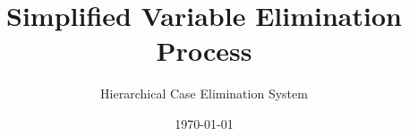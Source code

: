 \documentclass{article}
\begin{document}
\title{Simplified Variable Elimination Process}
\author{Hierarchical Case Elimination System}
\date{\today}
\maketitle
\end{document}
